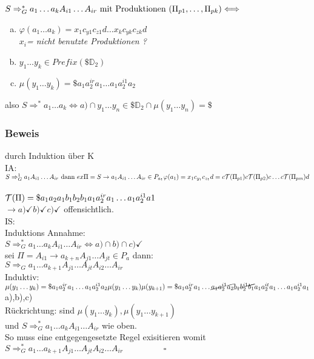 	$S\Rightarrow_G^* a_1\dots a_kA_{i1}\dots A_{ir} \text{ mit Produktionen } (\Pi_{p1},\dots,\Pi_{pk})\\
	\Longleftrightarrow$\\
	\begin{enumerate}[(a)]
		\item $\varphi(a_1\dots a_k)=x_1c_{y1}c_{z1}d\dots x_kc_{yk}c_{zk}d$ \\\textit{$x_i$= nicht benutzte Produktionen ?}
		\item $y_1\dots y_k \in Prefix(\$\mathds{D}_2)$
		\item $\mu(y_1\dots y_k)= \$a_1a_2^{ir}a_1\dots a_1a_2^{i1}a_2$
	\end{enumerate}
	also $S\Rightarrow^* a_1\dots a_k \Leftrightarrow a) \cap y_1\dots y_n \in \$ \mathds{D}_2 \cap \mu(y_1\dots y_n)=\$$
\subsubsection{Beweis}durch Induktion über K\\

		IA:\\$ S\Rightarrow_G^1 a_1A_{i1}\dots A_{ir} \text{ dann }\\
		ex \Pi =S \rightarrow a_1A_{i1}\dots A_{ir} \in P_{a_1} \\
		\varphi(a_1)=x_1c_{y_1}c_{z_1}d= c\mathcal{T}(\Pi_{p1})c\mathcal{T}(\Pi_{p2})c\dots c \mathcal{T}(\Pi_{pm})d$\\\\
		$\mathcal{T}(\Pi)=\$a_1a_2a_1b_1b_2b_1a_1a_2^{ir}a_1\dots a_1a_2^{i1}a1$\\
		$	\rightarrow a) \checkmark b) \checkmark c)\checkmark$ offensichtlich.\\
		IS:  \\
		Induktions Annahme:\\
		$S\Rightarrow_G^*a_1\dots a_k A_{i1}\dots A_{ir} \Leftrightarrow a)\cap b) \cap c) \checkmark$\\
		sei $\Pi = A_{i1} \rightarrow a_{k+n} A_{j1}\dots A_{jt} \in P_a$ dann:\\
		$S \Rightarrow_G a_1\dots a_{k+1} %
		A_{j1}\dots A_{jt}A_{i2}\dots A_{ir}$\\
		Induktiv:\\
		$\mu(y_1\dots y_k)=\$a_1a_2^{ir}a_1\dots a_1a_2^{i1}a_2\\
		\mu(y_1\dots y_k)\mu(y_{k+1})=\$a_1a_2^{ir}a_1\dots \cancel{a_1a_2^{i1}a_2} \cancel{b_1b_2^{i1}b_1}a_1a_2^{it}a_1\dots a_1a_2^{i1}a_1\\$
		a),b),c) \checkmark\\
		Rückrichtung: sind $\mu(y_1\dots y_k), \mu(y_1 \dots y_{k+1})$\\
		und $S\Rightarrow_G^* a_1\dots a_k A_{i1}\dots A_{ir}$ wie oben.\\
		So muss eine entgegengesetzte Regel exisitieren womit\\
		$S\Rightarrow_G^* a_1\dots a_{k+1}A_{j1}\dots A_{jt}A_{i2}\dots A_{ir}
		\hspace{2cm}\square$



